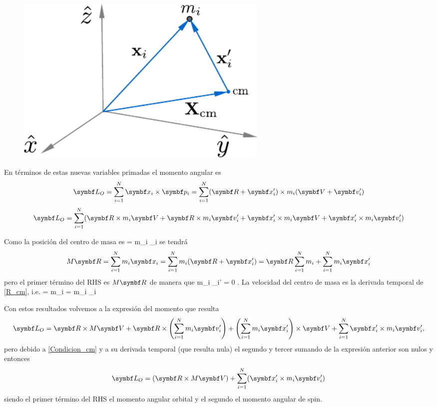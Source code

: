 \documentclass[10pt,oneside]{CBFT_book}
\begin{document}
\begin{figure}[hbt]
	\begin{center}
	\includegraphics[width=0.6\textwidth]{images/fig_mc_angularmom.pdf}	
	\end{center}
	\caption{}
	\label{fig_mc_angularmom}
\end{figure} 

En términos de estas nuevas variables primadas el momento angular es
\[
	\vb{L}_O = \Sum{i=1}{N} \vb{x}_i \times \vb{p}_i = 
	\Sum{i=1}{N} (\vb{R} + \vb{x}_i') \times m_i (\vb{V} + \vb{v}_i')
\]
\[
	\vb{L}_O = \Sum{i=1}{N} ( \vb{R} \times m_i \vb{V}  + \vb{R} \times m_i \vb{v}_i'
	+ \vb{x}_i' \times m_i \vb{V} 	+ \vb{x}_i' \times m_i \vb{v}_i' )
\]

Como la posición del centro de masa es
\be
	 =   m_i _i  
	\label{R_cm}
\ee
se tendrá 
\[
	M \vb{R} = \Sum{i=1}{N} m_i \vb{x}_i = \Sum{i=1}{N} m_i ( \vb{R} + \vb{x}_i' ) =
	\vb{R} \Sum{i=1}{N} m_i + \Sum{i=1}{N} m_i \vb{x}_i'
\]
pero el primer término del RHS es $M\vb{R}$ de manera que 
\be
	 m_i _i' = 0 .
	\label{Condicion_cm}
\ee
La velocidad del centro de masa es la derivada temporal de \eqref{R_cm}, i.e.
\be
	 =   m_i  = 
	  m_i _i
	\label{V_cm}
\ee

Con estos resultados volvemos a la expresión del momento que resulta 
\[
	\vb{L}_O = \vb{R} \times M \vb{V}  + \vb{R} \times \left( \Sum{i=1}{N} m_i \vb{v}_i' \right) +
	\left( \Sum{i=1}{N} m_i \vb{x}_i' \right) \times \vb{V} + \Sum{i=1}{N} \vb{x}_i' \times m_i \vb{v}_i',
\]
pero debido a \eqref{Condicion_cm} y a su derivada temporal (que resulta nula) el segundo y tercer sumando de la 
expresión anterior son nulos y entonces 
\[
	\vb{L}_O = \left( \vb{R} \times M \vb{V} \right) + \Sum{i=1}{N} ( \vb{x}_i' \times m_i \vb{v}_i' )
\]
siendo el primer término del RHS el momento angular orbital y el segundo el momento angular de spin.
\end{document}
